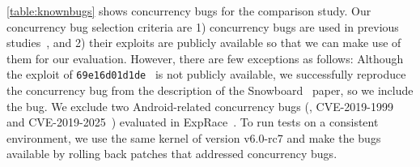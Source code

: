 



%
\autoref{table:knownbugs} shows concurrency bugs for the
comparison study.
%
Our concurrency bug selection criteria are 1)
concurrency bugs are used in previous studies~\cite{exprace, razzer,
  snowboard, moonshine, fuze}, and 2) their exploits are publicly
available so that we can make use of them for our evaluation.
%
However, there are few exceptions as follows: Although the exploit of
\texttt{69e16d01d1de}~\cite{snowboardbug} is not publicly available,
we successfully reproduce the concurrency bug from the description of
the Snowboard~\cite{snowboard} paper, so we include the bug.
%
%
We exclude two Android-related concurrency bugs (\ie,
CVE-2019-1999~\cite{cve20191999} and CVE-2019-2025~\cite{cve20192025})
evaluated in ExpRace~\cite{exprace}.
To run tests on a consistent environment, we use the same kernel 
of version v6.0-rc7 and make the bugs available by rolling back patches 
that addressed concurrency bugs.

%
%



